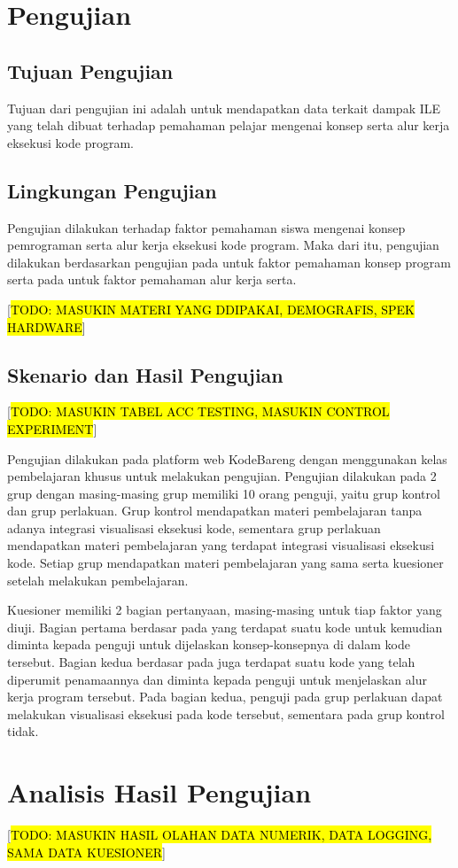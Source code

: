 \section{Pengujian}

\subsection{Tujuan Pengujian}
Tujuan dari pengujian ini adalah untuk mendapatkan data terkait dampak ILE yang telah dibuat terhadap pemahaman pelajar mengenai konsep serta alur kerja eksekusi kode program.

\subsection{Lingkungan Pengujian}
Pengujian  dilakukan terhadap faktor pemahaman siswa mengenai konsep pemrograman serta alur kerja eksekusi kode program. Maka dari itu, pengujian dilakukan berdasarkan pengujian pada \textcite{mayer1981psychology} untuk faktor pemahaman konsep program serta pada \textcite{moons2013pilot} untuk faktor pemahaman alur kerja serta.

  [\hl{TODO: MASUKIN MATERI YANG DDIPAKAI, DEMOGRAFIS, SPEK HARDWARE}]

\subsection{Skenario dan Hasil Pengujian}
[\hl{TODO: MASUKIN TABEL ACC TESTING, MASUKIN CONTROL EXPERIMENT}]

Pengujian dilakukan pada platform web KodeBareng dengan menggunakan kelas pembelajaran khusus untuk melakukan pengujian. Pengujian dilakukan pada 2 grup dengan masing-masing grup memiliki 10 orang penguji, yaitu grup kontrol dan grup perlakuan. Grup kontrol mendapatkan materi pembelajaran tanpa adanya integrasi visualisasi eksekusi kode, sementara grup perlakuan mendapatkan materi pembelajaran yang terdapat integrasi visualisasi eksekusi kode. Setiap grup mendapatkan materi pembelajaran yang sama serta kuesioner setelah melakukan pembelajaran.

Kuesioner memiliki 2 bagian pertanyaan, masing-masing untuk tiap faktor yang diuji. Bagian pertama berdasar pada \textcite{mayer1981psychology} yang terdapat suatu kode untuk kemudian diminta kepada penguji untuk dijelaskan konsep-konsepnya di dalam kode tersebut. Bagian kedua berdasar pada \textcite{moons2013pilot} juga terdapat suatu kode yang telah diperumit penamaannya dan diminta kepada penguji untuk menjelaskan alur kerja program tersebut. Pada bagian kedua, penguji pada grup perlakuan dapat melakukan visualisasi eksekusi pada kode tersebut, sementara pada grup kontrol tidak.


\section{Analisis Hasil Pengujian}
 [\hl{TODO: MASUKIN HASIL OLAHAN DATA NUMERIK, DATA LOGGING, SAMA DATA KUESIONER}]

\blindtext